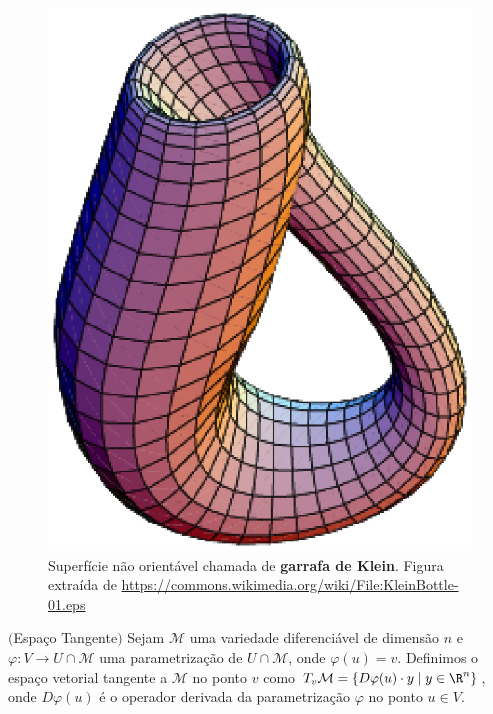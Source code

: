 \begin{figure}[h]
\begin{center} 
\includegraphics*[angle=0,scale=0.5]{imagens/cap2/KleinBottle-01.eps} 
\caption{Superfície não orientável chamada de {\bf garrafa de Klein}. Figura extraída de \url{https://commons.wikimedia.org/wiki/File:KleinBottle-01.eps} } 
\label{fig.BoySurface}
\end{center}
\end{figure}

\begin{defi} $($Espaço Tangente$)$
Sejam $\mathcal{M}$ uma variedade diferenci\'avel de dimens\~ao $n$ e $\varphi : V \rightarrow U \cap \mathcal{M}$ uma parametriza\c c\~ao de $U \cap \mathcal{M}$, onde $\varphi(u) = v$.
Definimos o espa\c co vetorial tangente a $\mathcal{M}$ no ponto $v$ como $T_{v}\mathcal{M} = \{ D\varphi(u) \cdot y \; | \; y \in {\R}^{n}\}$, onde $D\varphi(u)$ é o operador derivada da parametrização $\varphi$ no ponto $u \in V$. 
\end{defi}


